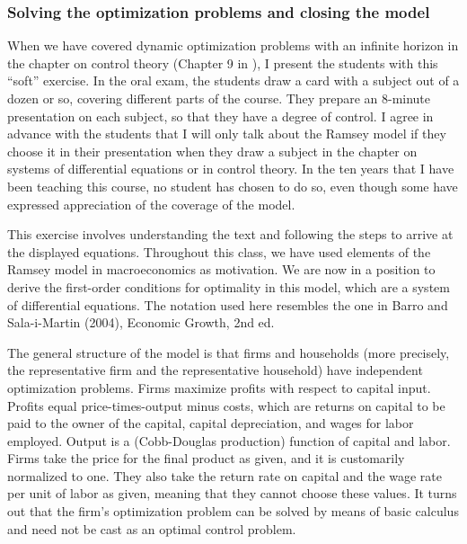 \documentclass[10pt]{article}
\begin{document}
\subsubsection{Solving the optimization problems and closing the model}

When we have covered dynamic optimization problems with an infinite horizon in the chapter on control theory (Chapter 9 in \cite{Sydsaeter2008}), I present the students with this ``soft'' exercise. In the oral exam, the students draw a card with a subject out of a dozen or so, covering different parts of the course. They prepare an 8-minute presentation on each subject, so that they have a degree of control.  I agree in advance with the students that I will only talk about the Ramsey model if they choose it in their presentation when they draw a subject in the chapter on systems of differential equations or in control theory. In the ten years that I have been teaching this course, no student has chosen to do so, even though some have expressed appreciation of the coverage of the model.

\smallskip

This exercise involves understanding the text and following the steps to arrive at the displayed equations. Throughout this class, we have used elements of the Ramsey model in macroeconomics as motivation.  We are now in a position to derive the first-order conditions for optimality in this model, which are a system of differential equations. The notation used here resembles the one in Barro and Sala-i-Martin (2004), Economic Growth, 2nd ed.    

\smallskip

The general structure of the model is that firms and households (more precisely, the representative firm and the representative household) have independent optimization problems. Firms maximize profits with respect to capital input.  Profits equal price-times-output minus costs, which are returns on capital to be paid to the owner of the capital, capital depreciation, and wages for labor employed.  Output is a (Cobb-Douglas production) function of capital and labor.  Firms take the price for the final product as given, and it is customarily normalized to one.  They also take the return rate on capital and the wage rate per unit of labor as given, meaning that they cannot choose these values.  It turns out that the firm's optimization problem can be solved by means of basic calculus and need not be cast as an optimal control problem.

\smallskip
\end{document}
